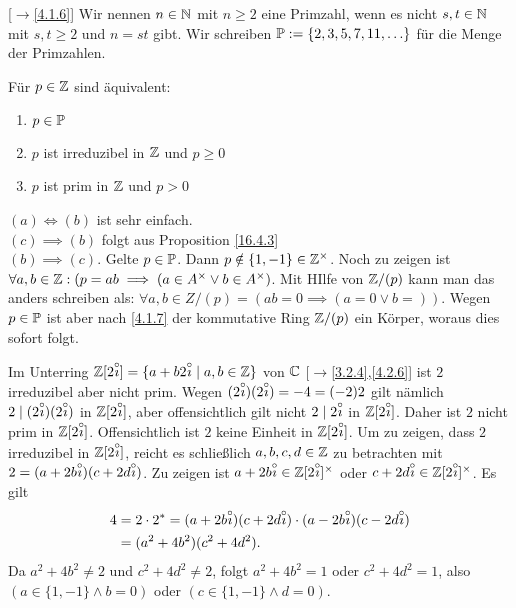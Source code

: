 \documentclass[../../main.tex]{subfiles}
\begin{document}
\begin{er}\mbox{}[$\to$\ref{4.1.6}]
\label{16.4.5}
Wir nennen $n\in \N$ mit $n\ge 2$ eine Primzahl, wenn es nicht $s,t\in \N$ mit $s,t\ge 2$ und $n=st$ gibt. Wir schreiben $\P:=\{2,3,5,7,11,\ldots \}$ für die Menge der Primzahlen.
\end{er}

\begin{pro}\label{16.4.6}
Für $p\in \Z$ sind äquivalent:
\begin{enumerate}[\normalfont(a)]
\item $p\in \P$
\item $p$ ist irreduzibel in $\Z$ und $p\ge 0$
\item $p$ ist prim in $\Z$ und $p>0$
\end{enumerate}
\end{pro}
\begin{cproof}
\underline{$(a)\Longleftrightarrow (b)$} ist sehr einfach.\\

\noindent \underline{$(c)\implies (b)$} folgt aus Proposition \ref{16.4.3}\\

\noindent \underline{$(b)\implies (c)$}. Gelte $p\in \P$. Dann $p\notin\{1,-1\}\in \Z^\times$. Noch zu zeigen ist $\forall a,b\in \Z:(p=ab\implies (a\in A^\times\lor b\in A^\times)$. Mit HIlfe von $\Z/(p)$ kann man das anders schreiben als: $\forall a,b\in Z/(p)=(ab=0\implies(a=0\lor b=))$. Wegen $p\in \P$ ist aber nach \ref{4.1.7} der kommutative Ring $\Z/(p)$ ein Körper, woraus dies sofort folgt.
\end{cproof}

\begin{bsp}\label{16.4.7}
Im Unterring $\Z[2\i]=\{a+b2\i\mid a,b\in \Z\}$ von $\C$ [$\to$\ref{3.2.4},\ref{4.2.6}] ist $2$ irreduzibel aber nicht prim. Wegen $(2\i)(2\i)=-4=(-2)2$ gilt nämlich $2\mid (2\i)(2\i)$ in $\Z[2\i]$, aber offensichtlich gilt nicht $2\mid 2\i$ in $\Z[2\i]$. Daher ist $2$ nicht prim in $\Z[2\i]$. Offensichtlich ist $2$ keine Einheit in $\Z[2\i]$. Um zu zeigen, dass $2$ irreduzibel in $\Z[2\i]$, reicht es schließlich $a,b,c,d\in \Z$ zu betrachten mit $2=(a+2b\i)(c+2d\i)$. Zu zeigen ist $a+2b\i\in \Z[2\i]^\times$ oder $c+2d\i\in\Z[2\i]^\times$. Es gilt
\begin{align*}
4&=2\cdot 2^*=(a+2b\i)(c+2d\i)\cdot (a-2b\i)(c-2d\i)\\
&=(a^2+4b^2)(c^2+4d^2).
\end{align*}
Da $a^2+4b^2\neq 2$ und $c^2+4d^2\neq 2$, folgt $a^2+4b^2=1$ oder $c^2+4d^2=1$, also $(a\in\{1,-1\}\land b=0)$ oder $(c\in\{1,-1\}\land d=0)$.
\end{bsp}
\end{document}
